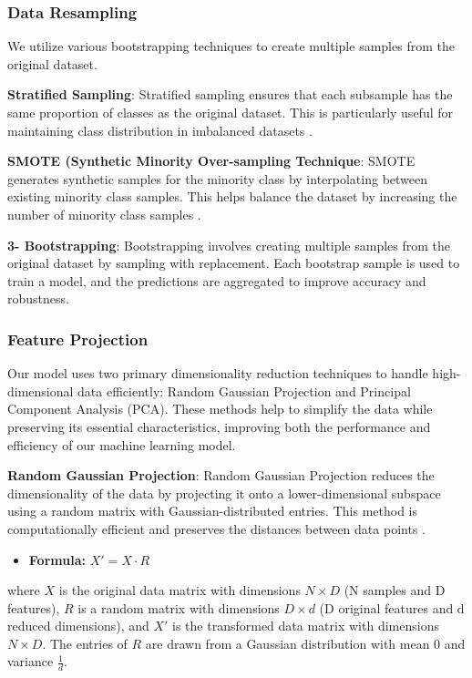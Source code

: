 \documentclass[a4paper]{article}
\begin{document}
\subsubsection{Data Resampling}
We utilize various bootstrapping techniques to create multiple samples from the original dataset.

\textbf{Stratified Sampling}: Stratified sampling ensures that each subsample has the same proportion of classes as the original dataset. This is particularly useful for maintaining class distribution in imbalanced datasets \citep{stratified}. 


\textbf{SMOTE (Synthetic Minority Over-sampling Technique}:
SMOTE generates synthetic samples for the minority class by interpolating between existing minority class samples. This helps balance the dataset by increasing the number of minority class samples \citep{smote}.

\textbf{3- Bootstrapping}: Bootstrapping involves creating multiple samples from the original dataset by sampling with replacement. Each bootstrap sample is used to train a model, and the predictions are aggregated to improve accuracy and robustness.


\subsubsection{Feature Projection}
Our model uses two primary dimensionality reduction techniques to handle high-dimensional data efficiently: Random Gaussian Projection and Principal Component Analysis (PCA). These methods help to simplify the data while preserving its essential characteristics, improving both the performance and efficiency of our machine learning model.

\textbf{Random Gaussian Projection}: Random Gaussian Projection reduces the dimensionality of the data by projecting it onto a lower-dimensional subspace using a random matrix with Gaussian-distributed entries. This method is computationally efficient and preserves the distances between data points \cite{randomProjection}.
\begin{itemize}
    \item \textbf{Formula:} \( X' = X \cdot R \) \end{itemize}

where \( X \) is the original data matrix with dimensions \( N \times D \) (N samples and D features), \( R \) is a random matrix with dimensions \( D \times d \) (D original features and d reduced dimensions), and \( X' \) is the transformed data matrix with dimensions \( N \times D \). The entries of \( R \) are drawn from a Gaussian distribution with mean 0 and variance \( \frac{1}{d} \).
\end{document}
